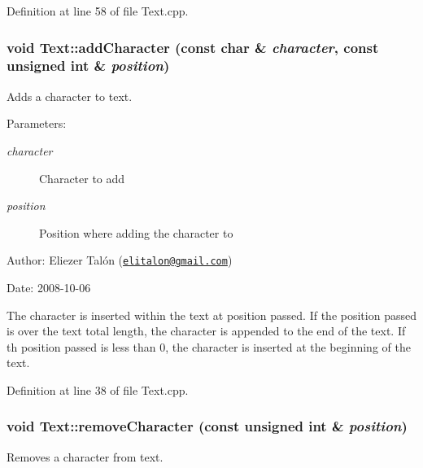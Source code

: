 Definition at line 58 of file Text.cpp.\hypertarget{class_text_fdd11ad0c90ca483d4cff3d74a64da9e}{
\subsubsection[addCharacter]{\setlength{\rightskip}{0pt plus 5cm}void Text::addCharacter (const char \& {\em character}, \/  const unsigned int \& {\em position})}}
\label{class_text_fdd11ad0c90ca483d4cff3d74a64da9e}


Adds a character to text. 

\begin{Desc}
\item[Parameters:]
\begin{description}
\item[{\em character}]Character to add \item[{\em position}]Position where adding the character to\end{description}
\end{Desc}
\begin{Desc}
\item[Author:]Eliezer Talón (\href{mailto:elitalon@gmail.com}{\tt elitalon@gmail.com}) \end{Desc}
\begin{Desc}
\item[Date:]2008-10-06\end{Desc}
The character is inserted within the text at position passed. If the position passed is over the text total length, the character is appended to the end of the text. If th position passed is less than 0, the character is inserted at the beginning of the text. 

Definition at line 38 of file Text.cpp.\hypertarget{class_text_e04500eeada2a4a3bb00554b32263c52}{
\subsubsection[removeCharacter]{\setlength{\rightskip}{0pt plus 5cm}void Text::removeCharacter (const unsigned int \& {\em position})}}
\label{class_text_e04500eeada2a4a3bb00554b32263c52}


Removes a character from text. 

